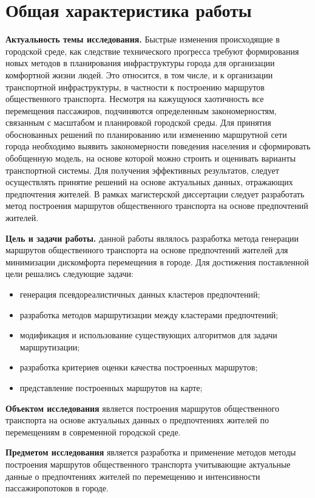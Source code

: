 \section{Общая характеристика работы}
\textbf{Актуальность темы исследования.} Быстрые изменения происходящие в городской среде, как следствие 
технического прогресса требуют формирования новых методов в планирования инфраструктуры города для 
организации комфортной жизни людей. Это относится, в том числе, и к организации транспортной 
инфраструктуры, в частности к построению маршрутов общественного транспорта. Несмотря на кажущуюся 
хаотичность все перемещения пассажиров, подчиняются определенным закономерностям, связанным с масштабом и 
планировкой городской среды. Для принятия обоснованных решений по планированию или изменению маршрутной 
сети города необходимо выявить закономерности поведения населения и сформировать обобщенную модель, на 
основе которой можно строить и оценивать варианты транспортной системы. Для получения эффективных 
результатов, следует осуществлять принятие решений на основе актуальных данных, отражающих предпочтения 
жителей. В рамках магистерской диссертации следует разработать метод построения маршрутов общественного 
транспорта на основе предпочтений жителей.

\textbf{Цель и задачи работы.} данной работы являлось разработка метода генерации маршрутов общественного 
транспорта на основе предпочтений жителей для минимизации дискомфорта перемещения в городе. Для достижения 
поставленной цели решались следующие задачи:
\begin{itemize}
    \item генерация псевдореалистичных данных кластеров предпочтений;
    \item разработка методов маршрутизации между кластерами предпочтений;
    \item модификация и использование существующих алгоритмов для задачи маршрутизации;
    \item разработка критериев оценки качества построенных маршрутов;
    \item представление построенных маршрутов на карте;
\end{itemize}

\textbf{Объектом исследования} является построения маршрутов общественного транспорта на основе актуальных 
данных о предпочтениях жителей по перемещениям в современной городской среде. 

\textbf{Предметом исследования} является разработка и применение методов методы построения маршрутов 
общественного транспорта учитывающие актуальные данные о предпочтениях жителей по перемещению и 
интенсивности пассажиропотоков в городе.

